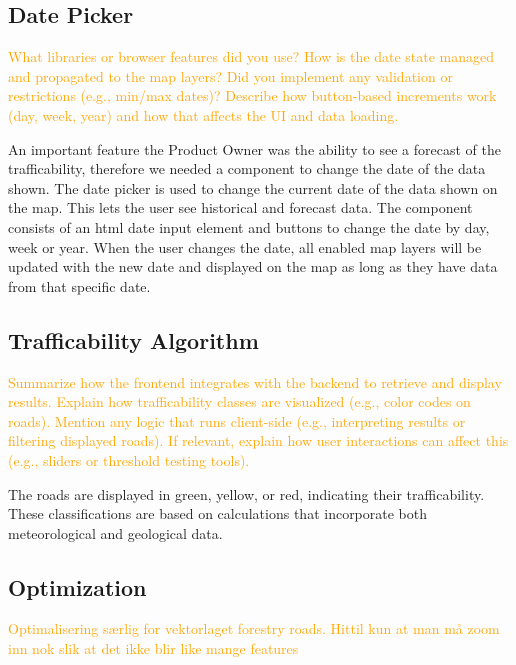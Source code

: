 \subsection{Date Picker}

\textcolor{orange}{What libraries or browser features did you use?
How is the date state managed and propagated to the map layers?
Did you implement any validation or restrictions (e.g., min/max dates)?
Describe how button-based increments work (day, week, year) and how that affects the UI and data loading.}

An important feature the Product Owner was the ability to see a forecast of the trafficability, therefore we needed a component to change the date of the data shown. The date picker is used to change the current date of the data shown on the map. This lets the user see historical and forecast data. The component consists of an \acrshort{html} date input element and buttons to change the date by day, week or year. When the user changes the date, all enabled map layers will be updated with the new date and displayed on the map as long as they have data from that specific date.

\subsection{Trafficability Algorithm} 

\textcolor{orange}{Summarize how the frontend integrates with the backend to retrieve and display results.
Explain how trafficability classes are visualized (e.g., color codes on roads).
Mention any logic that runs client-side (e.g., interpreting results or filtering displayed roads).
If relevant, explain how user interactions can affect this (e.g., sliders or threshold testing tools).}
\begin{figure}[H]

\end{figure}
The roads are displayed in green, yellow, or red, indicating their trafficability. These classifications are based on calculations that incorporate both meteorological and geological data.

\subsection{Optimization}

\textcolor{orange}{Optimalisering særlig for vektorlaget forestry roads. Hittil kun at man må zoom inn nok slik at det ikke blir like mange features}

